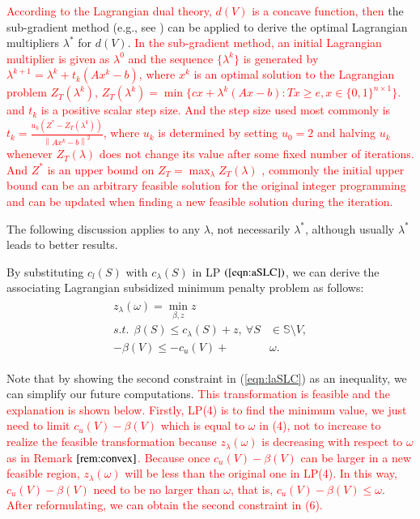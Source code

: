 \documentclass[authoryear,review,12pt]{elsarticle}
\begin{document}
\textcolor{red}{According to the Lagrangian dual theory, $d(V)$ is a concave function, then}
the sub-gradient method (e.g., see \citealt{fisher1981lagrangian}) can be applied to derive the optimal Lagrangian multipliers $\lambda^*$ for $d(V)$.
\textcolor{red}{In the sub-gradient method, an initial Lagrangian multiplier is given as $\lambda^0$ and the sequence $\{\lambda^k\}$ is generated by $\lambda^{k+1}= \lambda^k + t_k (Ax^k - b)$, where $x^k$ is an optimal solution to the Lagrangian problem $Z_T(\lambda^k)$, $Z_T(\lambda^k) = \min \big\{ cx + \lambda^k (Ax - b): Tx \geq e, x \in \{0,1\}^{n \times 1} \big\}.
$ and $t_k$ is a positive scalar step size. And the step size used most commonly is
$t_{k}=\frac{u_{k}\left(Z^{*}-Z_{T}\left(\lambda^{k}\right)\right)}{\left\|A x^{k}-b\right\|^{2}}$, where $u_k$ is determined by setting $u_0 = 2$ and halving $u_k$ whenever $Z_{T}(\lambda)$ does not change its value after some fixed number of iterations. And $Z^{*}$ is an upper bound on $Z_{T}=\max_{\lambda} Z_{T}(\lambda)$
, commonly the initial upper bound can be an arbitrary feasible solution for the original integer programming and can be updated when finding a new feasible solution during the iteration.}

The following discussion applies to any $\lambda$, not necessarily $\lambda^*$, although usually $\lambda^*$ leads to better results.

By substituting $c_l(S)$ with $c_{\lambda}(S)$ in LP $(\ref{eqn:aSLC})$, we can derive the associating Lagrangian subsidized minimum penalty problem as follows:
\begin{eqnarray}\label{eqn:laSLC}
\begin{aligned}
z_{\lambda}(\omega) = \min_{\beta,z} z~~&\\
s.t.~~ \beta(S) \leq  c_{\lambda}(S) + z,~ \forall S &\in \mathbb{S} \setminus V,\\
-\beta(V) \leq -  c_u(V)+&\omega.
\end{aligned}
\end{eqnarray}

Note that by showing the second constraint in (\ref{eqn:laSLC}) as an inequality, we can simplify our future computations.
\textcolor{red}{
This transformation is feasible and the explanation is shown below.
Firstly, LP(4) is to find the minimum value, we just need to limit $c_u(V)- \beta(V)$ which is equal to $\omega$ in (4), not to increase to realize the feasible transformation because $z_{\lambda}(\omega)$ is decreasing with respect to $\omega$ as in Remark $\ref{rem:convex}$. Because once $c_u(V)- \beta(V)$ can be larger in a new feasible region, $z_{\lambda}(\omega)$ will be less than the original one in LP(4). In this way, $c_u(V)- \beta(V)$ need to be no larger than $\omega$, that is, $c_u(V)- \beta(V) \leq \omega$. After reformulating, we can obtain the second constraint in (6).}
\end{document}
